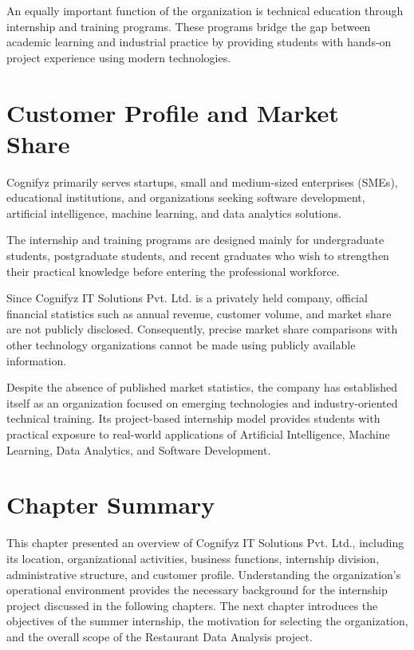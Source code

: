 \documentclass[12pt,a4paper]{report}
\begin{document}
An equally important function of the organization is technical education through internship and training programs. These programs bridge the gap between academic learning and industrial practice by providing students with hands-on project experience using modern technologies.


\section{Customer Profile and Market Share}

Cognifyz primarily serves startups, small and medium-sized enterprises (SMEs), educational institutions, and organizations seeking software development, artificial intelligence, machine learning, and data analytics solutions.

The internship and training programs are designed mainly for undergraduate students, postgraduate students, and recent graduates who wish to strengthen their practical knowledge before entering the professional workforce.

Since Cognifyz IT Solutions Pvt. Ltd. is a privately held company, official financial statistics such as annual revenue, customer volume, and market share are not publicly disclosed. Consequently, precise market share comparisons with other technology organizations cannot be made using publicly available information.

Despite the absence of published market statistics, the company has established itself as an organization focused on emerging technologies and industry-oriented technical training. Its project-based internship model provides students with practical exposure to real-world applications of Artificial Intelligence, Machine Learning, Data Analytics, and Software Development.


\section{Chapter Summary}

This chapter presented an overview of Cognifyz IT Solutions Pvt. Ltd., including its location, organizational activities, business functions, internship division, administrative structure, and customer profile. Understanding the organization's operational environment provides the necessary background for the internship project discussed in the following chapters. The next chapter introduces the objectives of the summer internship, the motivation for selecting the organization, and the overall scope of the Restaurant Data Analysis project.
\end{document}
